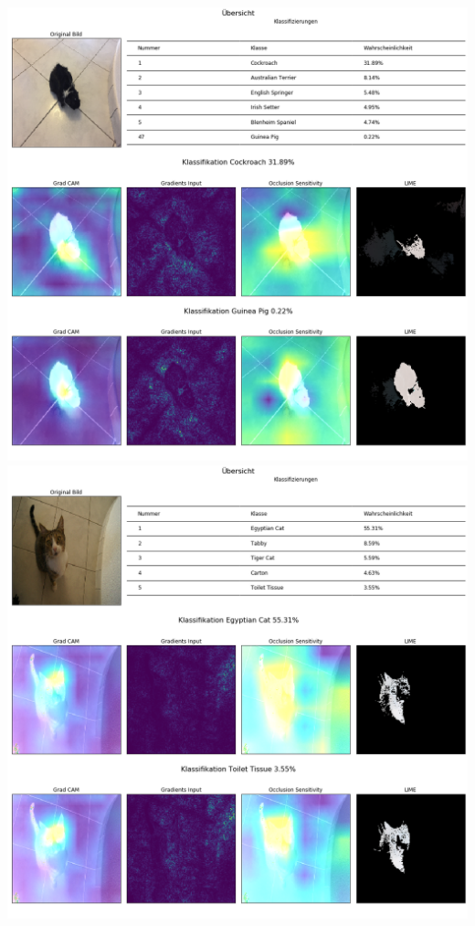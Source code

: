 \documentclass[
  12pt, %
  a4paper, %
  oneside, %
  openany, 
  numbers=noenddot, %
  BCOR=5mm, %
  parskip=half*, %
  thesis, %
]{bfhbook}
\begin{document}
\includegraphics[width=\textwidth]{Bilder/Oreo-Classification.png}
\includegraphics[width=\textwidth]{Bilder/Mira-Classification.png}
\end{document}
